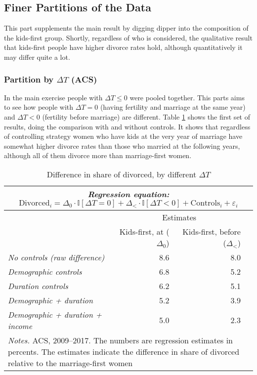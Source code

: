 \documentclass[12pt,letter]{article}
\newcommand{\I}{\mathbb{I}}
\begin{document}
\subsection{Finer Partitions of the Data}
This part supplements the main result by digging dipper into the composition of the kids-first group. Shortly, regardless of who is considered, the qualitative result that kids-first people have higher divorce rates hold, although quantitatively it may differ quite a lot.

\subsubsection{Partition by $\Delta T$ (ACS)}
In the main exercise people with $\Delta T \leq 0$ were pooled together. This parts aims to see how people with $\Delta T = 0$ (having fertility and marriage at the same year) and $\Delta T < 0$ (fertility before marriage) are different. Table \ref{dt_table} shows the first set of results, doing the comparison with and without controls. It shows that regardless of controlling strategy women who have kids at the very year of marriage have somewhat higher divorce rates than those who married at the following years, although all of them divorce more than marriage-first women.

\begin{table}[h]
\caption{Difference in share of divorced, by different $\Delta T$\label{dt_table}}
\begin{tabular}{l r r r }
\multicolumn{4}{c}{\textit{Regression equation:} $\text{Divorced}_i = \Delta_0 \cdot \I[\Delta T = 0] + \Delta_{<} \cdot \I[\Delta T < 0]  + \text{Controls}_i + \varepsilon_i$} \\\hline
\hline
& \multicolumn{2}{c}{Estimates} &   \\
& Kids-first, at ($\Delta_0$)  & Kids-first, before ($\Delta_<$)  \\\hline
\textit{No controls (raw difference) }&  8.6 &  8.0  \\
\textit{Demographic controls }& 6.8 &  5.2 \\ 
\textit{Duration controls} &  6.2 &  5.1 \\ 
\textit{Demographic + duration} &  5.2 &  3.9 \\
\textit{Demographic + duration + income} & 5.0 &  2.3  \\\hline
\multicolumn{4}{p{\linewidth}}{\footnotesize \textit{Notes.} ACS, 2009--2017. The numbers are regression estimates in percents.  The estimates indicate the difference in share of divorced relative to the marriage-first women}\\\hline\hline
\end{tabular}
\end{table}
\end{document}
